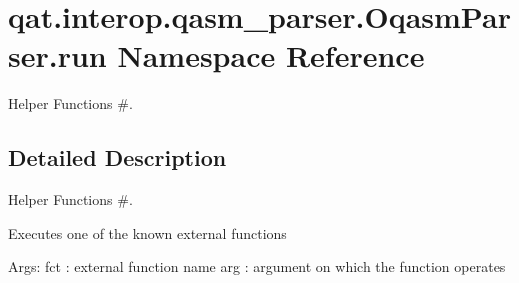 \hypertarget{namespaceqat_1_1interop_1_1qasm__parser_1_1OqasmParser_1_1run}{\section{qat.\-interop.\-qasm\-\_\-parser.\-Oqasm\-Parser.\-run Namespace Reference}
\label{namespaceqat_1_1interop_1_1qasm__parser_1_1OqasmParser_1_1run}
}


Helper Functions \#.  




\subsection{Detailed Description}
Helper Functions \#. \begin{DoxyVerb}Executes one of the known external functions
\end{DoxyVerb}
 Args\-: fct \-: external function name arg \-: argument on which the function operates 